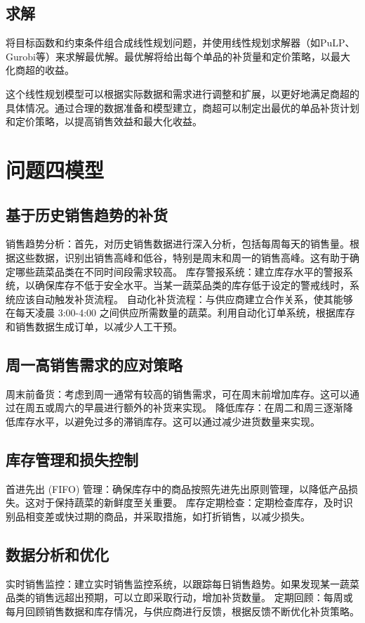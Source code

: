 \documentclass[withoutpreface,bwprint]{cumcmthesis} %
\begin{document}
		\subsection{求解}
		将目标函数和约束条件组合成线性规划问题，并使用线性规划求解器（如PuLP、Gurobi等）来求解最优解。最优解将给出每个单品的补货量和定价策略，以最大化商超的收益。
		
		这个线性规划模型可以根据实际数据和需求进行调整和扩展，以更好地满足商超的具体情况。通过合理的数据准备和模型建立，商超可以制定出最优的单品补货计划和定价策略，以提高销售效益和最大化收益。
		
	
	\section{问题四模型}
\subsection{基于历史销售趋势的补货}
	销售趋势分析：首先，对历史销售数据进行深入分析，包括每周每天的销售量。根据这些数据，识别出销售高峰和低谷，特别是周末和周一的销售高峰。这有助于确定哪些蔬菜品类在不同时间段需求较高。
	库存警报系统：建立库存水平的警报系统，以确保库存不低于安全水平。当某一蔬菜品类的库存低于设定的警戒线时，系统应该自动触发补货流程。
	自动化补货流程：与供应商建立合作关系，使其能够在每天凌晨 3:00-4:00 之间供应所需数量的蔬菜。利用自动化订单系统，根据库存和销售数据生成订单，以减少人工干预。
\subsection{周一高销售需求的应对策略}
	周末前备货：考虑到周一通常有较高的销售需求，可在周末前增加库存。这可以通过在周五或周六的早晨进行额外的补货来实现。
	降低库存：在周二和周三逐渐降低库存水平，以避免过多的滞销库存。这可以通过减少进货数量来实现。
\subsection{库存管理和损失控制}	
	首进先出 (FIFO) 管理：确保库存中的商品按照先进先出原则管理，以降低产品损失。这对于保持蔬菜的新鲜度至关重要。
	库存定期检查：定期检查库存，及时识别品相变差或快过期的商品，并采取措施，如打折销售，以减少损失。
\subsection{数据分析和优化}
	实时销售监控：建立实时销售监控系统，以跟踪每日销售趋势。如果发现某一蔬菜品类的销售远超出预期，可以立即采取行动，增加补货数量。
	定期回顾：每周或每月回顾销售数据和库存情况，与供应商进行反馈，根据反馈不断优化补货策略。
\end{document}
